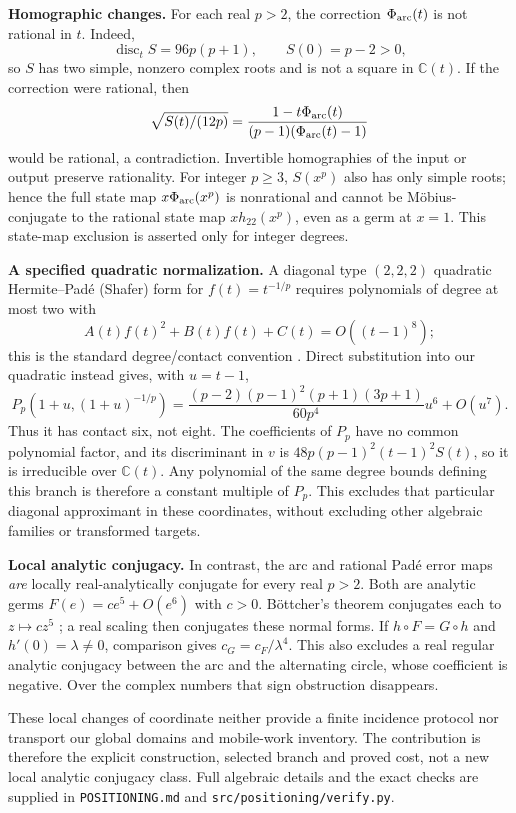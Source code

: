 \documentclass[11pt,a4paper]{article}
\begin{document}
\textbf{Homographic changes.} For each real $p>2$, the correction $\Phi_{\rm arc}(t)$ is not rational in $t$. Indeed,
\[
 \operatorname{disc}_t S=96p(p+1),\qquad S(0)=p-2>0,
\]
so $S$ has two simple, nonzero complex roots and is not a square in $\mathbb C(t)$. If the correction were rational, then
\[
 \sqrt{S(t)/(12p)}=\frac{1-t\Phi_{\rm arc}(t)}{(p-1)(\Phi_{\rm arc}(t)-1)}
\]
would be rational, a contradiction. Invertible homographies of the input or output preserve rationality. For integer $p\ge3$, $S(x^p)$ also has only simple roots; hence the full state map $x\Phi_{\rm arc}(x^p)$ is nonrational and cannot be M\"obius-conjugate to the rational state map $x h_{22}(x^p)$, even as a germ at $x=1$. This state-map exclusion is asserted only for integer degrees.

\textbf{A specified quadratic normalization.} A diagonal type $(2,2,2)$ quadratic Hermite--Pad\'e (Shafer) form for $f(t)=t^{-1/p}$ requires polynomials of degree at most two with
\[
 A(t)f(t)^2+B(t)f(t)+C(t)=O((t-1)^8);
\]
this is the standard degree/contact convention \cite[eqs.~(1.4)--(1.6)]{cabayLabahn1989}. Direct substitution into our quadratic instead gives, with $u=t-1$,
\[
 P_p(1+u,(1+u)^{-1/p})
 =\frac{(p-2)(p-1)^2(p+1)(3p+1)}{60p^4}u^6+O(u^7).
\]
Thus it has contact six, not eight. The coefficients of $P_p$ have no common polynomial factor, and its discriminant in $v$ is $48p(p-1)^2(t-1)^2S(t)$, so it is irreducible over $\mathbb C(t)$. Any polynomial of the same degree bounds defining this branch is therefore a constant multiple of $P_p$. This excludes that particular diagonal approximant in these coordinates, without excluding other algebraic families or transformed targets.

\textbf{Local analytic conjugacy.} In contrast, the arc and rational Pad\'e error maps \emph{are} locally real-analytically conjugate for every real $p>2$. Both are analytic germs $F(e)=c e^5+O(e^6)$ with $c>0$. B\"ottcher's theorem conjugates each to $z\mapsto c z^5$ \cite[Introduction]{buffEpsteinKoch2011}; a real scaling then conjugates these normal forms. If $h\circ F=G\circ h$ and $h'(0)=\lambda\ne0$, comparison gives $c_G=c_F/\lambda^4$. This also excludes a real regular analytic conjugacy between the arc and the alternating circle, whose coefficient is negative. Over the complex numbers that sign obstruction disappears.

These local changes of coordinate neither provide a finite incidence protocol nor transport our global domains and mobile-work inventory. The contribution is therefore the explicit construction, selected branch and proved cost, not a new local analytic conjugacy class. Full algebraic details and the exact checks are supplied in \texttt{POSITIONING.md} and \texttt{src/positioning/verify.py}.

\clearpage
\begingroup\footnotesize\setlength{\bibsep}{1pt}
\endgroup
\end{document}
